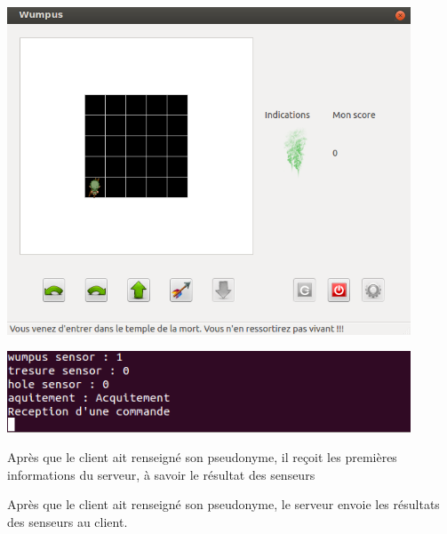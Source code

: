 \documentclass[a4paper,10pt]{article}
\begin{document}
		
		\begin{minipage}[t]{0.46\textwidth}
			\vspace{2pt}
			\centering
			\includegraphics[width=0.9\textwidth]{JeuxDEssais/Wumpus3.png}
		\end{minipage}
		\hfill
		\begin{minipage}[t]{0.46\textwidth}
			\vspace{20pt}
			\centering
			\includegraphics[width=0.9\textwidth]{JeuxDEssais/Serveur3.png}
		\end{minipage}

		\begin{minipage}[t]{0.46\textwidth}
			\vspace{2pt}
			Après que le client ait renseigné son pseudonyme, il reçoit les premières informations du serveur, à savoir le résultat des senseurs
		\end{minipage}
		\hfill
		\begin{minipage}[t]{0.46\textwidth}
			\vspace{2pt}
			Après que le client ait renseigné son pseudonyme, le serveur envoie les résultats des senseurs au client.
		\end{minipage}\\

\end{document}
